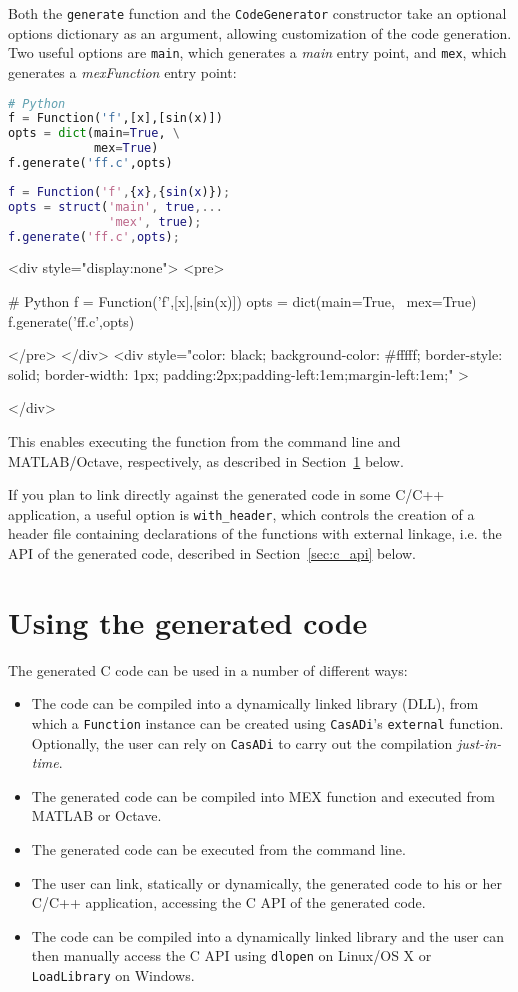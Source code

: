 \documentclass[a4paper,12pt]{book}
\newcommand{\CasADi}{\texttt{CasADi}\xspace}
\newcounter{pytexcount}
\newcounter{pytexsubcount}
\renewenvironment{pytexoutput}
{\addtocounter{pytexsubcount}{1}%
\begin{rawhtml}
<div style="display:none">
<pre>
\end{rawhtml}
}%
{\begin{rawhtml}
</pre>
</div>
<div style="color: black; background-color: \#fffff;  border-style: solid; border-width: 1px; padding:2px;padding-left:1em;margin-left:1em;" >\end{rawhtml}%
\verbatiminputeval{pytex_\alph{pytexcount}_\arabic{pytexsubcount}.log}%
\begin{rawhtml}
</div>
\end{rawhtml}
}
\begin{document}
Both the \texttt{generate} function and the \texttt{CodeGenerator} constructor take an optional
options dictionary as an argument, allowing customization of the code generation. Two useful
options are \verb|main|, which generates a \emph{main} entry point, and \verb|mex|,
which generates a \emph{mexFunction} entry point:

\begin{minipage}[t]{0.5\textwidth}
\begin{lstlisting}[language=Python]
# Python
f = Function('f',[x],[sin(x)])
opts = dict(main=True, \
            mex=True)
f.generate('ff.c',opts)
\end{lstlisting}
\end{minipage}
\begin{minipage}[t]{0.5\textwidth}
\begin{lstlisting}[language=Matlab]
% MATLAB
f = Function('f',{x},{sin(x)});
opts = struct('main', true,...
              'mex', true);
f.generate('ff.c',opts);
\end{lstlisting}
\end{minipage}
\begin{pytexoutput}
# Python
f = Function('f',[x],[sin(x)])
opts = dict(main=True, \
            mex=True)
f.generate('ff.c',opts)
\end{pytexoutput}

This enables executing the function from the command line and MATLAB/Octave, respectively,
as described in Section~\ref{sec:using_codegen} below.

If you plan to link directly against the generated code in some C/C++ application,
a useful option is \verb|with_header|, which controls the creation of a header file
containing declarations of the functions with external linkage, i.e. the API of
the generated code, described in Section~\ref{sec:c_api} below.

\section{Using the generated code} \label{sec:using_codegen}
The generated C code can be used in a number of different ways:
\begin{itemize}
  \item The code can be compiled into a dynamically linked library (DLL),
  from which a \texttt{Function} instance can be created using \CasADi's
  \texttt{external} function. Optionally, the user can rely on \CasADi to
  carry out the compilation \emph{just-in-time}.
  \item The generated code can be compiled into MEX function and executed from MATLAB or Octave.
  \item The generated code can be executed from the command line.
  \item The user can link, statically or dynamically, the generated code to his
  or her C/C++ application, accessing the C API of the generated code.
  \item The code can be compiled into a dynamically linked library and the user can then
  manually access the C API using \texttt{dlopen} on Linux/OS X or \texttt{LoadLibrary}
  on Windows.
\end{itemize}
\end{document}
